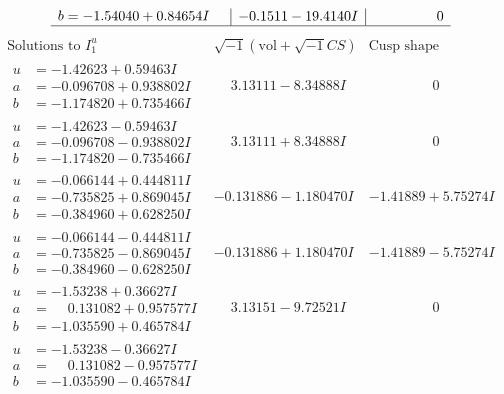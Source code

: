 \documentclass[1p]{elsarticle_modified}
\theoremstyle{definition}
\newcommand{\I}{\sqrt{-1}}
\begin{document}
$$\begin{array}{c|c|c}
\begin{aligned}
b &= -1.54040 + 0.84654 I\end{aligned}
 & -0.1511 - 19.4140 I & \phantom{-0.000000 } 0\\
 \hline 
 \end{array}$$\newpage$$\begin{array}{c|c|c}  
\text{Solutions to }I^u_{1}& \I (\text{vol} + \sqrt{-1}CS) & \text{Cusp shape}\\
 \hline 
\begin{aligned}
u &= -1.42623 + 0.59463 I \\
a &= -0.096708 + 0.938802 I \\
b &= -1.174820 + 0.735466 I\end{aligned}
 & \phantom{-}3.13111 - 8.34888 I & \phantom{-0.000000 } 0 \\ \hline\begin{aligned}
u &= -1.42623 - 0.59463 I \\
a &= -0.096708 - 0.938802 I \\
b &= -1.174820 - 0.735466 I\end{aligned}
 & \phantom{-}3.13111 + 8.34888 I & \phantom{-0.000000 } 0 \\ \hline\begin{aligned}
u &= -0.066144 + 0.444811 I \\
a &= -0.735825 + 0.869045 I \\
b &= -0.384960 + 0.628250 I\end{aligned}
 & -0.131886 - 1.180470 I & -1.41889 + 5.75274 I \\ \hline\begin{aligned}
u &= -0.066144 - 0.444811 I \\
a &= -0.735825 - 0.869045 I \\
b &= -0.384960 - 0.628250 I\end{aligned}
 & -0.131886 + 1.180470 I & -1.41889 - 5.75274 I \\ \hline\begin{aligned}
u &= -1.53238 + 0.36627 I \\
a &= \phantom{-}0.131082 + 0.957577 I \\
b &= -1.035590 + 0.465784 I\end{aligned}
 & \phantom{-}3.13151 - 9.72521 I & \phantom{-0.000000 } 0 \\ \hline\begin{aligned}
u &= -1.53238 - 0.36627 I \\
a &= \phantom{-}0.131082 - 0.957577 I \\
b &= -1.035590 - 0.465784 I\end{aligned}

\end{array}$$
\end{document}
